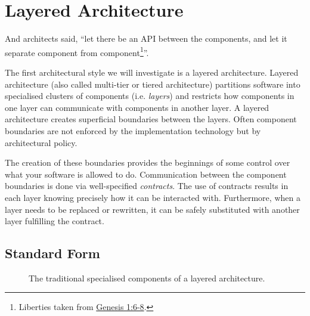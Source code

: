 \section{Layered Architecture}

And architects said, ``let there be an API between the components,
and let it separate component from component\footnote{Liberties taken from
\href{https://www.biblegateway.com/passage/?search=gen+1\&version=ESV}{Genesis 1:6-8}.}''.

The first architectural style we will investigate is a layered architecture.
Layered architecture (also called multi-tier or tiered architecture) 
partitions software into specialised clusters of components (i.e. \emph{layers})
and restricts how components in one layer can communicate with components in another layer.
A layered architecture creates superficial boundaries between the layers.
Often component boundaries are not enforced by the implementation technology but by architectural policy.

The creation of these boundaries provides the beginnings of some control over what your software is allowed to do.
Communication between the component boundaries is done via well-specified \emph{contracts}.
The use of contracts results in each layer knowing precisely how it can be interacted with.
Furthermore, when a layer needs to be replaced or rewritten, it can be safely substituted with another layer fulfilling the contract.


\subsection{Standard Form}

\begin{figure}[ht]
\centering
{}
\caption{The traditional specialised components of a layered architecture.}
\label{fig:traditional-layered}
\end{figure}

